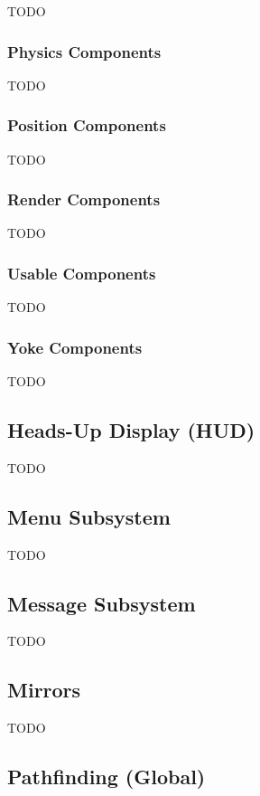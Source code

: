 TODO

\subsubsection{Physics Components}

TODO

\subsubsection{Position Components}

TODO

\subsubsection{Render Components}

TODO

\subsubsection{Usable Components}

TODO

\subsubsection{Yoke Components}

TODO

\subsection{Heads-Up Display (HUD)}

TODO

\subsection{Menu Subsystem}

TODO

\subsection{Message Subsystem}

TODO

\subsection{Mirrors}

TODO

\subsection{Pathfinding (Global)}

